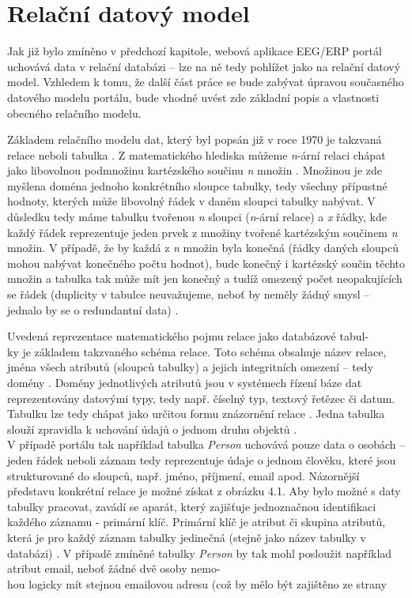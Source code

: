 \documentclass{projekt}
\begin{document}
\chapter{Relační datový model}
\hspace{0.65cm}Jak již bylo zmíněno v předchozí kapitole, webová aplikace EEG/ERP portál uchovává data v relační databázi – lze na ně tedy pohlížet jako na relační datový model. Vzhledem k tomu, že další část práce se bude zabývat úpravou současného datového modelu portálu, bude vhodné uvést zde základní popis a vlastnosti obecného relačního modelu.

Základem relačního modelu dat, který byl popsán již v roce 1970 je takzvaná relace neboli tabulka \cite{_17}. Z matematického hlediska můžeme {\it n}-ární relaci chápat jako libovolnou podmnožinu kartézského součinu {\it n} množin \cite{_18}. Množinou je zde myšlena doména jednoho konkrétního sloupce tabulky, tedy všechny přípustné hodnoty, kterých může libovolný řádek v daném sloupci tabulky nabývat. V důsledku tedy máme tabulku tvořenou {\it n} sloupci ({\it n}-ární relace) a {\it x} řádky, kde každý řádek reprezentuje jeden prvek z množiny tvořené kartézským součinem {\it n} množin. V případě, že by každá z {\it n} množin byla konečná (řádky daných sloupců mohou nabývat konečného počtu hodnot), bude konečný i kartézský součin těchto množin a tabulka tak může mít jen konečný a tudíž omezený počet neopakujících se řádek (duplicity v tabulce neuvažujeme, neboť by neměly žádný smysl – jednalo by se o redundantní data) \cite{_18}.

Uvedená reprezentace matematického pojmu relace jako databázové tabul-\\ky je základem takzvaného schéma relace. Toto schéma obsahuje název relace, jména všech atributů (sloupců tabulky) a jejich integritních omezení – tedy domény \cite{_19}. Domény jednotlivých atributů jsou v systémech řízení báze dat reprezentovány datovými typy, tedy např. číselný typ, textový řetězec či datum. Tabulku lze tedy chápat jako určitou formu znázornění relace \cite{_21}.
Jedna tabulka slouží zpravidla k uchování údajů o jednom druhu objektů \cite{_20}. \\V případě portálu tak například tabulka {\it Person} uchovává pouze data o osobách – jeden řádek neboli záznam tedy reprezentuje údaje o jednom člověku, které jsou strukturované do sloupců, např. jméno, příjmení, email apod. Názornější představu konkrétní relace je možné získat z obrázku 4.1. Aby bylo možné s daty tabulky pracovat, zavádí se aparát, který zajišťuje jednoznačnou identifikaci každého záznamu - primární klíč. Primární klíč je atribut či skupina atributů, která je pro každý záznam tabulky jedinečná (stejně jako název tabulky v databázi) \cite{_20}. V případě zmíněné tabulky {\it Person} by tak mohl posloužit například atribut email, neboť žádné dvě osoby nemo-\\hou logicky mít stejnou emailovou adresu (což by mělo být zajištěno ze strany 
\end{document}
